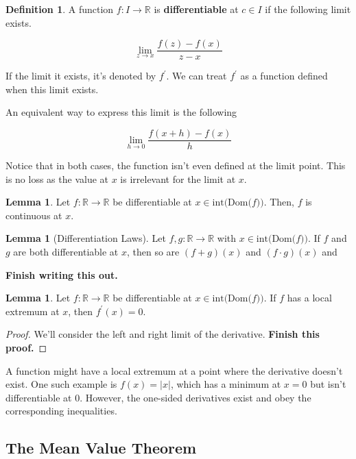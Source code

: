 \documentclass{article}
\theoremstyle{definition}
\newtheorem{definition}{Definition}
\newtheorem{lemma}[theorem]{Lemma}
\newcommand{\R}{\mathbb{R}}
\begin{document}
\begin{definition}
    A function $f: I \xrightarrow{} \R$ is \textbf{differentiable} at $c \in I$
    if the following limit exists.

    \[ \lim_{z \to x} \frac{f(z) - f(x)}{z-x} \]

    If the limit it exists, it's denoted by $f^{\prime}$. We can treat $f^{\prime}$
    as a function defined when this limit exists.
\end{definition}

An equivalent way to express this limit is the following

\[ \lim_{h \to 0} \frac{f(x+h) - f(x)}{h} \]

Notice that in both cases, the function isn't even defined at the limit point.
This is no loss as the value at $x$ is irrelevant for the limit at $x$.

\begin{lemma}
    Let $f: \R \xrightarrow{} \R$ be differentiable at $x \in \text{int(Dom($f$))}$.
    Then, $f$ is continuous at $x$.
\end{lemma}

\begin{lemma}[Differentiation Laws]
    Let $f,g: \R \xrightarrow{} \R$ with $x \in \text{int(Dom($f$))}$. If $f$ and $g$ are
    both differentiable at $x$, then so are $(f + g)(x)$ and $(f \cdot g)(x)$ and

    \textbf{Finish writing this out.}
\end{lemma}


\begin{lemma}
    Let $f: \R \xrightarrow{} \R$ be differentiable at $x \in \text{int(Dom($f$))}$.
    If $f$ has a local extremum at $x$, then $f^{\prime}(x) = 0$. 
\end{lemma}
\begin{proof}
    We'll consider the left and right limit of the derivative.
    \textbf{Finish this proof.}
\end{proof}

A function might have a local extremum at a point where the derivative doesn't exist.
One such example is $f(x) = \lvert x \rvert$, which has a minimum at $x=0$ but isn't differentiable
at $0$. However, the one-sided derivatives exist and obey the corresponding inequalities.

\subsection{The Mean Value Theorem}
\end{document}
